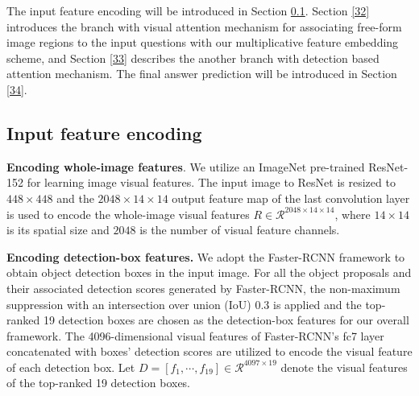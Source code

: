 \documentclass[letterpaper]{article}
\begin{document}
The input feature encoding will be introduced in Section \ref{31}. Section \ref{32} introduces the branch with visual attention mechanism for associating free-form image regions to the input questions with our multiplicative feature embedding scheme, and Section \ref{33} describes the another branch with detection based attention mechanism. The final answer prediction will be introduced in Section \ref{34}.

\subsection{Input feature encoding}\label{31}




\textbf{Encoding whole-image features}. We utilize an ImageNet pre-trained ResNet-152 \cite{he2016deep} for learning image visual features. The input image to ResNet is resized to $448\times 448$ and the $2048\times14\times14 $ output feature map of the last convolution layer is used to encode the whole-image visual features $R \in \mathcal{R}^{2048\times14\times14}$, where $14\times14$ is its spatial size and $2048$ is the number of visual feature channels.

\textbf{Encoding detection-box features.} We adopt the Faster-RCNN \cite{ren2015faster} framework to obtain object detection boxes in the input image. For all the object proposals and their associated detection scores generated by Faster-RCNN, the non-maximum suppression with an intersection over union (IoU) 0.3 is applied and the top-ranked 19 detection boxes are chosen as the detection-box features for our overall framework. The 4096-dimensional visual features of Faster-RCNN's fc7 layer concatenated with boxes' detection scores are utilized to encode the visual feature of each detection box. Let $D = [f_1,\cdots, f_{19}]  \in \mathcal{R}^{4097\times19}$ denote the visual features of the top-ranked 19 detection boxes.                                                                                                                                                                                                                                                                                                                                                                                                                                                                                                                                                                                                                                                              
\end{document}
